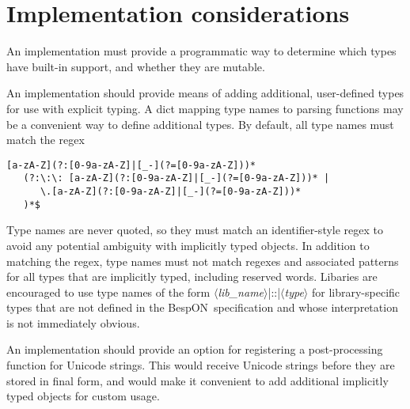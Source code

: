 \documentclass[11pt]{article}
\newcommand{\bespon}{BespON}
\newcommand{\vmeta}[1]{{\color{DarkRed}\ensuremath{\langle}\textit{#1}\ensuremath{\rangle}}}
\begin{document}
{{\section{Implementation considerations}

An implementation must provide a programmatic way to determine which types have built-in support, and whether they are mutable.

An implementation should provide means of adding additional, user-defined types for use with explicit typing.  A dict mapping type names to parsing functions may be a convenient way to define additional types.  By default, all type names must match the regex
\begin{Verbatim}
[a-zA-Z](?:[0-9a-zA-Z]|[_-](?=[0-9a-zA-Z]))*
   (?:\:\: [a-zA-Z](?:[0-9a-zA-Z]|[_-](?=[0-9a-zA-Z]))* | 
      \.[a-zA-Z](?:[0-9a-zA-Z]|[_-](?=[0-9a-zA-Z]))*
   )*$
\end{Verbatim}
Type names are never quoted, so they must match an identifier-style regex to avoid any potential ambiguity with implicitly typed objects.  In addition to matching the regex, type names must not match regexes and associated patterns for all types that are implicitly typed, including reserved words.  Libaries are encouraged to use type names of the form \vmeta{lib\_name}|::|\vmeta{type} for library-specific types that are not defined in the \bespon\ specification and whose interpretation is not immediately obvious.  

An implementation should provide an option for registering a post-processing function for Unicode strings.  This would receive Unicode strings before they are stored in final form, and would make it convenient to add additional implicitly typed objects for custom usage.









}}
\end{document}
